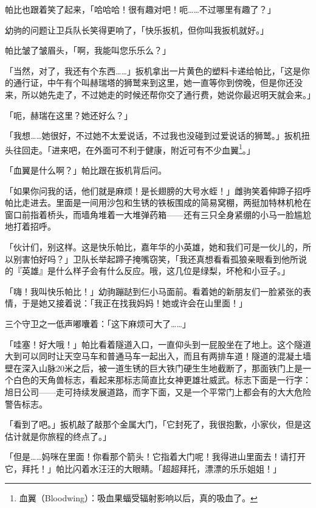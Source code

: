 帕比也跟着笑了起来，「哈哈哈！很有趣对吧！呃……不过哪里有趣了？」

幼驹的问题让卫兵队长笑得更响了，「快乐扳机，但你叫我扳机就好。」

帕比皱了皱眉头，「啊，我能叫您乐乐么？」

「当然，对了，我还有个东西……」扳机拿出一片黄色的塑料卡递给帕比，「这是你的通行证，中午有个叫赫瑞塔的狮鹫来到这里，她一直等你到傍晚，但是你还没来，所以她先走了，不过她走的时候还帮你交了通行费，她说你最迟明天就会来。」

「呃，赫瑞在这里？她还好么？」

「我想……她很好，不过她不太爱说话，不过我也没碰到过爱说话的狮鹫。」扳机扭头往回走。「进来吧，在外面可不利于健康，附近可有不少血翼\footnote{血翼（Bloodwing）：吸血果蝠受辐射影响以后，真的吸血了。}。」

「血翼是什么啊？」帕比跟在扳机背后问。

「如果你问我的话，他们就是麻烦！是长翅膀的大号水蛭！」雌驹笑着伸蹄子招呼帕比走进去。里面是一间用沙包和生锈的铁板围成的简易窝棚，两挺加特林机枪在窗口前指着桥头，而墙角堆着一大堆弹药箱——还有三只全身紧绷的小马一脸尴尬地打着招呼。

「伙计们，别这样。这是快乐帕比，嘉年华的小英雄，她和我们可是一伙儿的，所以别害怕好吗？」卫队长举起蹄子掩嘴窃笑，「我还真想看看孤狼亲眼看到他所说的『英雄』是什么样子会有什么反应。哦，这几位是绿梨，坏枪和小豆子。」

「嗨！我叫快乐帕比！」幼驹蹦跶到仨小马面前。看着她的新朋友们一脸紧张的表情，于是她又接着说：「我正在找我妈妈！她或许会在山里面！」

三个守卫之一低声嘟囔着：「这下麻烦可大了……」

\horizonline


「哇塞！好大哦！」帕比看着隧道入口，一直仰头到一屁股坐在了地上。这个隧道大到可以同时让天空马车和普通马车一起出入，而且有两排车道！隧道的混凝土墙壁在深入山脉20米之后，被一道生锈的巨大铁门硬生生地截断了，那面铁门上是一个白色的天角兽标志，看起来那标志简直比女神更雄壮威武。标志下面是一行字：旭日公司——走可持续发展道路，而字下面，又是一个平常门上都会有的大大危险警告标志。

「看到了吧。」扳机敲了敲那个金属大门，「它封死了，我很抱歉，小家伙，但是这估计就是你旅程的终点了。」

「但是……妈咪在里面！你看那个箭头！它指着大门呢！我得进山里面去！请打开它，拜托！」帕比闪着水汪汪的大眼睛。「超超拜托，漂漂的乐乐姐姐！」

